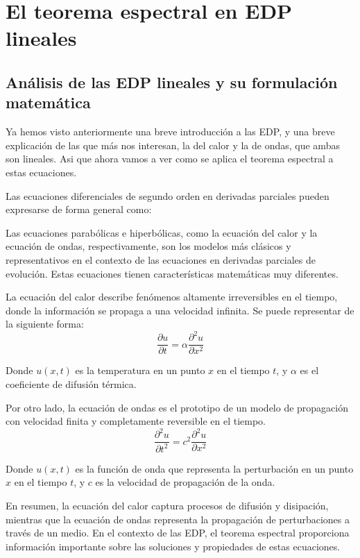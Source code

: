 \documentclass{article}
\begin{document}
\newpage

\section{El teorema espectral en EDP lineales}
    \subsection{Análisis de las EDP lineales y su formulación matemática}
    Ya hemos visto anteriormente una breve introducción a las EDP, y una breve explicación de las que más nos interesan, la del calor y la de ondas, que ambas son lineales. Asi que ahora vamos a ver como se aplica el teorema espectral a estas ecuaciones. 


    Las ecuaciones diferenciales de segundo orden en derivadas parciales pueden expresarse de forma general como:


    Las ecuaciones parabólicas e hiperbólicas, como la ecuación del calor y la ecuación de ondas, respectivamente, son los modelos más clásicos y representativos en el contexto de las ecuaciones en derivadas parciales de evolución. Estas ecuaciones tienen características matemáticas muy diferentes. 

    La ecuación del calor describe fenómenos altamente irreversibles en el tiempo, donde la información se propaga a una velocidad infinita. Se puede representar de la siguiente forma:
    \begin{equation}
        \frac{\partial u}{\partial t} = \alpha \frac{\partial^2 u}{\partial x^2}
        \end{equation}
    
        Donde $u(x,t)$ es la temperatura en un punto $x$ en el tiempo $t$, y $\alpha$ es el coeficiente de difusión térmica.

    Por otro lado, la ecuación de ondas es el prototipo de un modelo de propagación con velocidad finita y completamente reversible en el tiempo.
    \begin{equation}
        \frac{\partial^2 u}{\partial t^2} = c^2 \frac{\partial^2 u}{\partial x^2}
        \end{equation}
        
        Donde $u(x,t)$ es la función de onda que representa la perturbación en un punto $x$ en el tiempo $t$, y $c$ es la velocidad de propagación de la onda.



    En resumen, la ecuación del calor captura procesos de difusión y disipación, mientras que la ecuación de ondas representa la propagación de perturbaciones a través de un medio. En el contexto de las EDP, el teorema espectral proporciona información importante sobre las soluciones y propiedades de estas ecuaciones.
\end{document}
